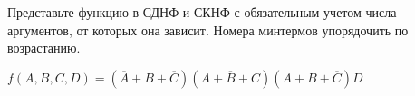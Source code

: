 \question Представьте функцию в СДНФ и СКНФ с обязательным учетом числа аргументов,
 от которых она зависит. Номера минтермов упорядочить по возрастанию.

$f(A,B,C,D) = (\overline{A}+B+\overline{C})(A+\overline{B}+C)(A+B+\overline{C})D$